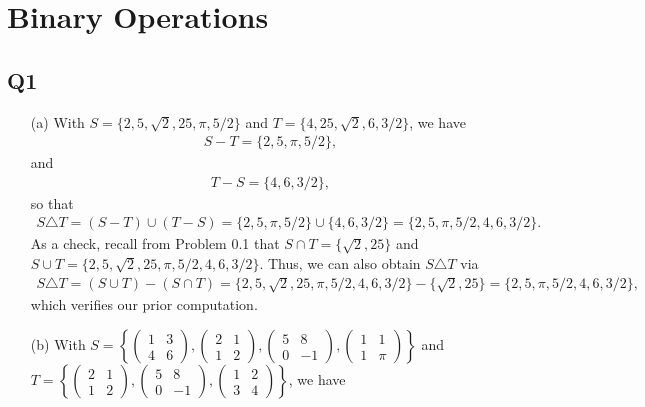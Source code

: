 \documentclass[12pt]{article}
\numberwithin{theorem}{section}
\numberwithin{equation}{section}
\numberwithin{remark}{section}
\numberwithin{definition}{section}
\numberwithin{theorem}{section}
\numberwithin{lemma}{section}
\numberwithin{example}{section}
\begin{document}
\newpage

\section{Binary Operations}

\subsection{Q1}

\begin{itemize}
	\item[(a)]{With $S = \{2,5,\sqrt{2},25,\pi,5/2\}$ and $T=\{4,25,\sqrt{2},6,3/2\}$, we have
		\begin{align*}
			S-T = \{2,5,\pi,5/2\},
		\end{align*}
		and
		\begin{align*}
			T-S = \{4,6,3/2\},
		\end{align*}
		so that 
		\begin{align*}
			S\triangle T = \left(S - T\right) \cup \left(T - S\right) = \{2,5,\pi,5/2\} \cup \{4,6,3/2\} = \{2,5,\pi,5/2,4,6,3/2\}.
		\end{align*}
		As a check, recall from Problem 0.1 that $S\cap T = \{\sqrt{2},25\}$ and $S\cup T = \{2,5,\sqrt{2},25,\pi,5/2,4,6,3/2\}$. Thus, we can also obtain $S\triangle T$ via
		\begin{align*}
			S\triangle T = \left(S \cup T\right) - \left(S \cap T\right)= \{2,5,\sqrt{2},25,\pi,5/2,4,6,3/2\} - \{\sqrt{2},25\} = \{2,5,\pi,5/2,4,6,3/2\},
		\end{align*}
		which verifies our prior computation.}
	\item[(b)]{With $S=\left\{\begin{pmatrix} 1 & 3 \\ 4 & 6 \end{pmatrix}, \begin{pmatrix} 2 & 1 \\ 1 & 2 \end{pmatrix}, \begin{pmatrix} 5 & 8 \\ 0 & -1 \end{pmatrix}, \begin{pmatrix} 1 & 1 \\ 1 & \pi \end{pmatrix}\right\}$ and $T=\left\{\begin{pmatrix} 2 & 1 \\ 1 & 2 \end{pmatrix}, \begin{pmatrix} 5 & 8 \\ 0 & -1 \end{pmatrix}, \begin{pmatrix} 1 & 2 \\ 3 & 4 \end{pmatrix}\right\}$, we have
}
\end{itemize}
\end{document}
